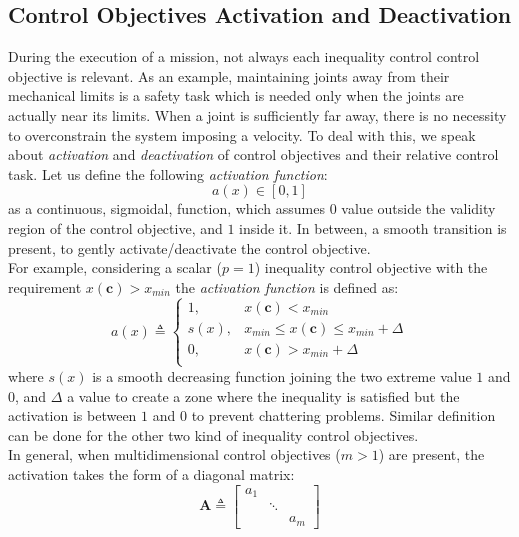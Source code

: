 
\subsection{Control Objectives Activation and Deactivation}
\label{sec:activations}
During the execution of a mission, not always each inequality control control objective is relevant. As an example, maintaining joints away from their mechanical limits is a safety task which is needed only when the joints are actually near its limits. When a joint is sufficiently far away, there is no necessity to overconstrain the system imposing a velocity. To deal with this, we speak about \textit{activation} and \textit{deactivation} of control objectives and their relative control task.
Let us define the following \textit{activation function}:
\begin{equation}
	a(x) \in [0,1]
\end{equation}
as a continuous, sigmoidal, function, which assumes $0$ value outside the validity region of the control objective, and $1$ inside it. In between, a smooth transition is present, to gently activate/deactivate the control objective. \\
For example, considering a scalar ($ p = 1 $) inequality control objective with the requirement $x(\boldsymbol{c}) > x_{min}$ the \textit{activation function} is defined as:
\begin{equation}
	\label{eq_activation_f}
	a(x) \triangleq
	\begin{cases}1,& x(\boldsymbol{c}) < x_{min}\\
	s(x),& x_{min} \leq x(\boldsymbol{c}) \leq x_{min} + \Delta\\
	0, & x(\boldsymbol{c}) > x_{min} + \Delta\\
	\end{cases}
\end{equation}    
where $s(x)$ is a smooth decreasing function joining the two extreme value $1$ and $0$, and $\Delta$ a value to create a zone where the inequality is satisfied but the activation is between $1$ and $0$ to prevent chattering problems. Similar definition can be done for the other two kind of inequality control objectives.\\

In general, when multidimensional control objectives ($m > 1$) are present, the activation takes the form of a diagonal matrix:
\begin{equation}
\boldsymbol{A} \triangleq
	\begin{bmatrix}
	a_1 & & \\
	& \ddots & \\
	& & a_m	 
	\end{bmatrix}
\end{equation}

